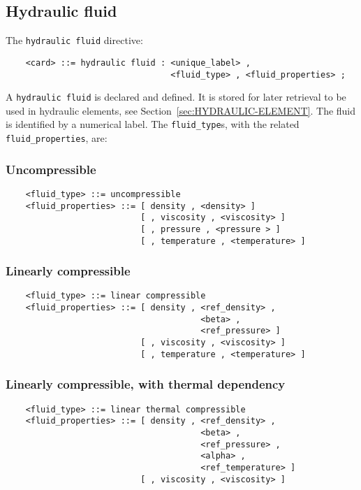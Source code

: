 \subsection{Hydraulic fluid}\label{sec:HYDRAULIC-FLUID}
The \texttt{hydraulic fluid} directive:
\begin{verbatim}
    <card> ::= hydraulic fluid : <unique_label> , 
                                 <fluid_type> , <fluid_properties> ;
\end{verbatim}
A \texttt{hydraulic fluid} is declared and defined.
It is stored for later retrieval to be used in hydraulic elements,
see Section~\ref{sec:HYDRAULIC-ELEMENT}.
The fluid is identified by a numerical label. 
The \texttt{fluid\_type}s, with the related \texttt{fluid\_properties}, are:

\subsubsection{Uncompressible}
\begin{verbatim}
    <fluid_type> ::= uncompressible
    <fluid_properties> ::= [ density , <density> ]
                           [ , viscosity , <viscosity> ]
                           [ , pressure , <pressure > ]
                           [ , temperature , <temperature> ]
\end{verbatim}

\subsubsection{Linearly compressible}
\begin{verbatim}
    <fluid_type> ::= linear compressible
    <fluid_properties> ::= [ density , <ref_density> , 
                                       <beta> , 
                                       <ref_pressure> ]
                           [ , viscosity , <viscosity> ]
                           [ , temperature , <temperature> ]
\end{verbatim}

\subsubsection{Linearly compressible, with thermal dependency}
\begin{verbatim}
    <fluid_type> ::= linear thermal compressible
    <fluid_properties> ::= [ density , <ref_density> , 
                                       <beta> , 
                                       <ref_pressure> ,
                                       <alpha> ,
                                       <ref_temperature> ]
                           [ , viscosity , <viscosity> ]
\end{verbatim}

